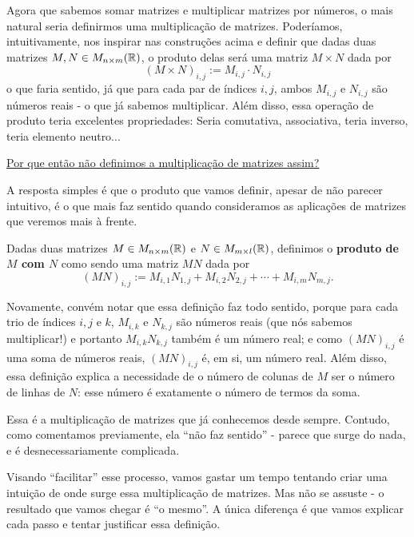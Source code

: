 Agora que sabemos somar matrizes e multiplicar matrizes por números, o mais natural seria definirmos uma multiplicação de matrizes. Poderíamos, intuitivamente, nos inspirar nas construções acima e definir que dadas duas matrizes $M,N\in M_{n\times m}(\mathbb R)$, o produto delas será uma matriz $M\times N$ dada por
\[(M\times N)_{i,j}:=M_{i,j}\cdot N_{i,j}\]o que faria sentido, já que para cada par de índices $i,j$, ambos $M_{i,j}$ e $N_{i,j}$ são números reais - o que já sabemos multiplicar. Além disso, essa operação de produto teria excelentes propriedades: Seria comutativa, associativa, teria inverso, teria elemento neutro...

\underline{Por que então não definimos a multiplicação de matrizes assim?}

A resposta simples é que o produto que vamos definir, apesar de não parecer intuitivo, é o que mais faz sentido quando consideramos as aplicações de matrizes que veremos mais à frente. 

\begin{df}\label{df:produto-classico}
	Dadas duas matrizes $M\in M_{n\times m}(\mathbb R)$ e $N\in M_{m\times l}(\mathbb R)$, definimos o \textbf{produto de $M$ com $N$} como sendo uma matriz $MN$ dada por
	\[(MN)_{i,j}:=M_{i,1}N_{1,j}+M_{i,2}N_{2,j}+\cdots+M_{i,m}N_{m,j}.\]
\end{df}

\begin{rmk}
	Novamente, convém notar que essa definição faz todo sentido, porque para cada trio de índices $i,j$ e $k$, $M_{i,k}$ e $N_{k,j}$ são números reais (que nós sabemos multiplicar!) e portanto $M_{i,k}N_{k,j}$ também é um número real; e como $(MN)_{i,j}$ é uma soma de números reais, $(MN)_{i,j}$ é, em si, um número real. Além disso,  essa definição explica a necessidade de o número de colunas de $M$ ser o número de linhas de $N$: esse número é exatamente o número de termos da soma.
\end{rmk}

Essa é a multiplicação de matrizes que já conhecemos desde sempre. Contudo, como comentamos previamente, ela ``não faz sentido'' - parece que surge do nada, e é desnecessariamente complicada.

Visando ``facilitar'' esse processo, vamos gastar um tempo tentando criar uma intuição de onde surge essa multiplicação de matrizes. Mas não se assuste - o resultado que vamos chegar é ``o mesmo''. A única diferença é que vamos explicar cada passo e tentar justificar essa definição. 

